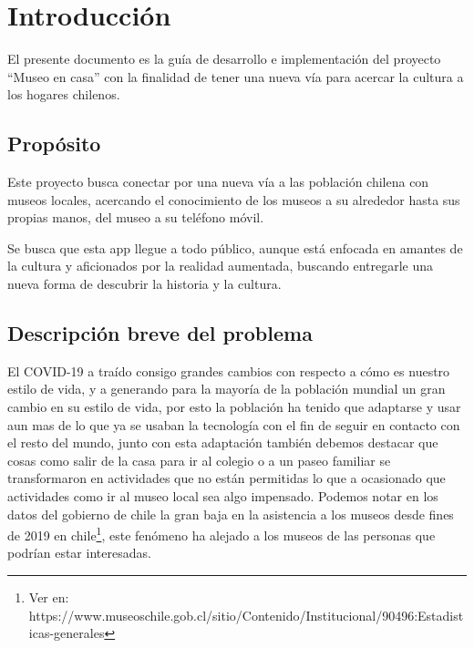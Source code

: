 \section{Introducción}
El presente documento es la guía de desarrollo e implementación del proyecto ``Museo en casa'' con la finalidad de tener una nueva vía para acercar la cultura a los hogares chilenos.

\subsection{Propósito}
Este proyecto busca conectar por una nueva vía a las población chilena con museos locales, acercando el conocimiento de los museos a su alrededor hasta sus propias manos, del museo a su teléfono móvil.

Se busca que esta app llegue a todo público, aunque está enfocada en amantes de la cultura y aficionados por la realidad aumentada, buscando entregarle una nueva forma de descubrir la historia y la cultura.

\subsection{Descripción breve del problema}
El COVID-19 a traído consigo grandes cambios con respecto a cómo es nuestro estilo de vida, y a generando para la mayoría de la población mundial un gran cambio en su estilo de vida, por esto la población ha tenido que adaptarse y usar aun mas de lo que ya se usaban la tecnología con el fin de seguir en contacto con el resto del mundo,  junto con esta adaptación también debemos destacar que cosas como salir de la casa para ir al colegio o a un paseo familiar se transformaron en actividades que no están permitidas lo que a ocasionado que actividades como ir al museo local sea algo impensado. Podemos notar en los datos del gobierno de chile la gran baja en la asistencia a los museos desde fines de 2019 en chile\footnote{Ver en: https://www.museoschile.gob.cl/sitio/Contenido/Institucional/90496:Estadisticas-generales}, este fenómeno ha alejado a los museos de las personas que podrían estar interesadas.
